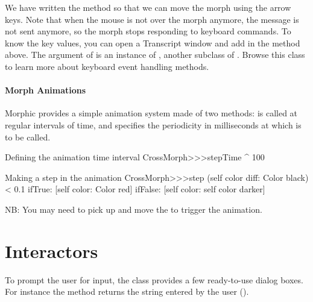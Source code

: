 \documentclass[a4paper,10pt,twoside]{book}
\begin{document}
We have written the method so that we can move the morph using the arrow keys.
Note that when the mouse is not over the morph anymore, the  message is not sent anymore, so the morph stops responding to keyboard commands.
To know the key values, you can open a Transcript window and add   in the method above.
The  argument of  is an instance of , another subclass of . Browse this class to learn more about keyboard event handling methods.

\paragraph{Morph Animations}

Morphic provides a simple animation system made of two methods:  is called at regular intervals of time, and  specifies the periodicity in milliseconds at which  is to be called.

\begin{method}{Defining the animation time interval}
CrossMorph>>>stepTime
   ^ 100
\end{method}
\begin{method}{Making a step in the animation}
CrossMorph>>>step
   (self color diff: Color black) < 0.1
      ifTrue: [self color: Color red]
      ifFalse: [self color: self color darker]
\end{method}
\noindent
NB: You may need to pick up and move the  to trigger the animation.


\section{Interactors}

To prompt the user for input, the  class provides a few ready-to-use dialog boxes.
For instance the  method returns the string entered by the user ().
\end{document}

